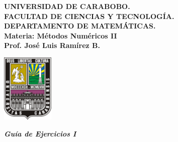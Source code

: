 \documentclass[12pt,letterpaper]{article}
\theoremstyle{plain}
\begin{document}
\thispagestyle{empty}


\begin{center}

\noindent\begin{minipage}{15.5cm}
\textbf{UNIVERSIDAD DE CARABOBO.\\
\noindent FACULTAD DE CIENCIAS Y TECNOLOG\'IA.\\
\noindent DEPARTAMENTO DE MATEM\'ATICAS.\\
\noindent Materia: M\'etodos Num\'ericos II\\
\noindent Prof. Jos\'e Luis Ram\'irez B.\\
}

\end{minipage}
\begin{minipage}[ht]{2.5cm}
\includegraphics[width=2.5cm]{LogoUC.jpg}
\end{minipage}


\begin{center} {\it\bf\large Gu\'ia de Ejercicios I}
\end{center}
\end{center}
\end{document}
